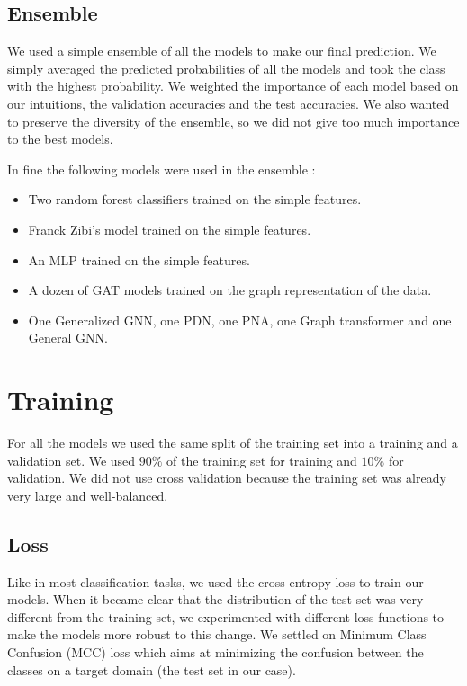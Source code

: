\documentclass[switch, 11pt]{article}
\begin{document}
\begin{multicols}{2}
    \subsection{Ensemble}

    We used a simple ensemble of all the models to make our final prediction. We simply averaged the predicted probabilities of all the models and took the class with the highest probability. We weighted the importance of each model based on our intuitions, the validation accuracies and the test accuracies. We also wanted to preserve the diversity of the ensemble, so we did not give too much importance to the best models.

    In fine the following models were used in the ensemble :
    \begin{itemize}
        \item Two random forest classifiers trained on the simple features.
        \item Franck Zibi's model trained on the simple features.
        \item An MLP trained on the simple features.
        \item A dozen of GAT models trained on the graph representation of the data.
        \item One Generalized GNN, one PDN, one PNA, one Graph transformer and one General GNN.
    \end{itemize}

    \section{Training}

    For all the models we used the same split of the training set into a training and a validation set. We used $90\%$ of the training set for training and $10\%$ for validation. We did not use cross validation because the training set was already very large and well-balanced.

    \subsection{Loss}
    Like in most classification tasks, we used the cross-entropy loss to train our models. When it became clear that the distribution of the test set was very different from the training set, we experimented with different loss functions to make the models more robust to this change. We settled on Minimum Class Confusion (MCC) loss \cite{jin-2020} which aims at minimizing the confusion between the classes on a target domain (the test set in our case).


\end{multicols}
\end{document}
